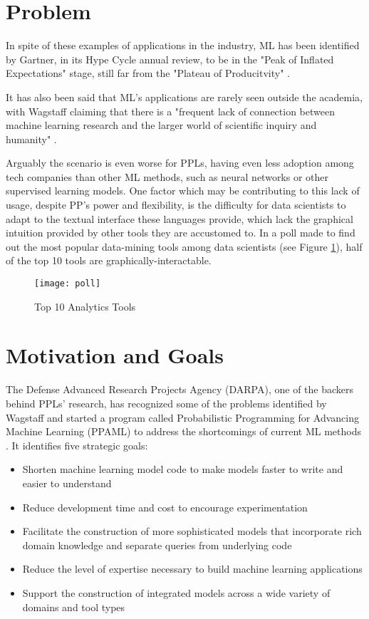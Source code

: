 \section{Problem} \label{sec:proj}

In spite of these examples of applications in the industry, ML has been
identified by Gartner, in its Hype Cycle annual review,
to be in the "Peak of Inflated Expectations" stage, still far
from the "Plateau of Producitvity" \cite{gartner}.

It has also been said that ML's applications are rarely seen
outside the academia, with Wagstaff claiming that there is a "frequent lack of
connection between machine learning research and the larger world of scientific
inquiry and humanity" \cite{Wagstaff2012}.

Arguably the scenario is even worse for PPLs, having even less adoption
among tech companies than other ML methods, such as neural networks or other
supervised learning models. One factor which may be contributing to this lack of
usage, despite PP's power and flexibility, is the difficulty for data scientists
to adapt to the textual interface these languages provide, which lack the graphical
intuition provided by other tools they are accustomed to. In a poll made to find
out the most popular data-mining tools among data scientists
(see Figure \ref{fig:poll}), half of the top 10 tools are
graphically-interactable.

\begin{figure}[t]
  \begin{center}
    \leavevmode
    \texttt{[image: poll]}
    \caption{Top 10 Analytics Tools \cite{kdn}}
    \label{fig:poll}
  \end{center}
\end{figure}

\section{Motivation and Goals} \label{sec:goals}

The Defense Advanced Research Projects Agency (DARPA), one of the backers behind
PPLs' research, has recognized some of the problems
identified by Wagstaff and started a program called Probabilistic Programming
for Advancing Machine Learning (PPAML) to address the shortcomings of
current ML methods \cite{darpa}. It identifies five strategic goals:

\begin{itemize}
  \item Shorten machine learning model code to make models faster to write and
  easier to understand
  \item Reduce development time and cost to encourage experimentation
  \item Facilitate the construction of more sophisticated models that
  incorporate rich domain knowledge and separate queries from underlying code
  \item Reduce the level of expertise necessary to build machine learning
  applications
  \item Support the construction of integrated models across a wide variety of
  domains and tool types
\end{itemize}

